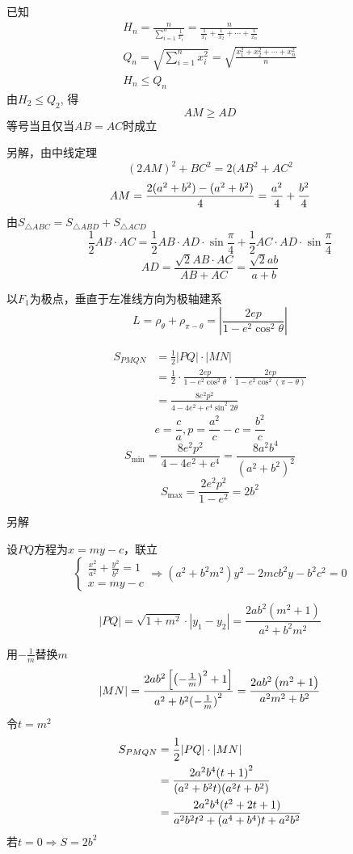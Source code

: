 \documentclass[UTF8]{article}
\begin{document}
已知
$$
\begin{array}{c} 
  H_{n}=\frac{n}{\sum \limits_{i=1}^{n}\frac{1}{x_{i}}}= \frac{n}{\frac{1}{x_{1}}+ \frac{1}{x_{2}}+ \cdots + \frac{1}{x_{n}}} \\ Q_{n}=\sqrt{\sum \limits_{i=1}^{n}x_{i}^{2}}= \sqrt{\frac{x_{1}^{2}+ x_{2}^{2}+ \cdots + x_{n}^{2}}{n}} \\ H_{n}\leq Q_{n} 
\end{array}
$$
由$H_2\le Q_2$,
得
$$
AM\ge AD
$$
等号当且仅当$AB=AC$时成立

另解，由中线定理
$$
{\left( {2AM} \right)^2} + B{C^2} = 2(A{B^2} + A{C^2}$$
$$AM = \frac{{2({a^2} + {b^2}) - ({a^2} + {b^2})}}{4} = \frac{{{a^2}}}{4} + \frac{{{b^2}}}{4}\\
$$
由$S_{\triangle ABC}=S_{\triangle ABD}+S_{\triangle ACD}$
$$
\frac{1}{2}AB \cdot AC = \frac{1}{2}AB \cdot AD \cdot \sin \frac{\pi }{4} + \frac{1}{2}AC \cdot AD \cdot \sin \frac{\pi }{4}$$
$$
AD = \frac{{\sqrt 2 AB \cdot AC}}{{AB + AC}} = \frac{{\sqrt 2 ab}}{{a + b}}
$$

以$F_1$为极点，垂直于左准线方向为极轴建系
$$
L = \rho _\theta + \rho _{\pi  - \theta}  = \left| \frac{2ep}{ {1 - {e^2}\cos ^2}\theta } \right|
$$

$$
\begin{aligned}
{S_{PMQN}}& = \frac{1}{2}|PQ| \cdot |MN|\\
& = \frac{1}{2} \cdot \frac{{2ep}}{{1 - {e^2}{{\cos }^2}\theta }} \cdot \frac{{2ep}}{{1 - {e^2}{{\cos }^2}(\pi-\theta)}}\\
&=\frac{{8{e^2}{p^2}}}{{4 - 4{e^2} + {e^4}{{\sin }^2}2\theta }}
\end{aligned}$$
$$
 e=\frac{c}{a},p=\frac{{{a^2}}}{c} - c = \frac{{{b^2}}}{c}
 $$
 $${S_{{\text{min}}}}=\frac{{8{e^2}{p^2}}}{{4 - 4{e^2} + {e^4}}}=\frac{{8{a^2}{b^4}}}{{{{({a^2} + {b^2})}^2}}}
 $$
 $${S_{{\text{max}}}} = \frac{{2{e^2}{p^2}}}{{1 - {e^2}}} = 2{b^2}
$$



另解

设$PQ$方程为$x=my-c$，联立
$$
\begin{cases}
\frac{{{x^2}}}{{{a^2}}} + \frac{{{y^2}}}{{{b^2}}} = 1\\
x=my-c
\end{cases} \Rightarrow ({a^2} + {b^2}{m^2}){y^2} - 2mc{b^2}y - {b^2}{c^2} = 0
$$

$$
|PQ| = \sqrt {1 + {m^2}}  \cdot |{y_1} - {y_2}| = \frac{{2a{b^2}({m^2} + 1)}}{{{a^2} + {b^2}{m^2}}}
$$

用$ - \frac{1}{m}$替换$m$
$$
|MN| = \frac{{2a{b^2}\left[{{\left( - \frac{1}{m}\right)}^2} + 1\right]}}{{{a^2} + {b^2}{{( - \frac{1}{m})}^2}}} = \frac{{2a{b^2}\left({m^2} + 1\right)}}{{{a^2}{m^2} + {b^2}}}\\
$$
令$t=m^2$
$$
\begin{aligned}
 {S_{PMQN}}& = \frac{1}{2}|PQ| \cdot |MN|\\
& = \frac{{2{a^2}{b^4}{{({t} + 1)}^2}}}{{({a^2} + {b^2}{t})({a^2}{t} + {b^2})}}\\
&=\frac{{2{a^2}{b^4}({t^2} + 2t + 1)}}{{{a^2}{b^2}{t^2} + ({a^4} + {b^4})t + {a^2}{b^2}}}
\end{aligned}\\
$$
若$t=0\Rightarrow S= 2{b^2}$
\end{document}
